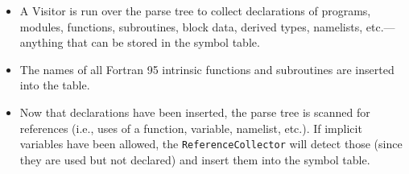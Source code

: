 \begin{itemize}

\item A Visitor is run over the parse tree to collect declarations of
programs, modules, functions, subroutines, block data, derived types,
namelists, etc.---anything that can be stored in the symbol table.

\item The names of all Fortran 95 intrinsic functions and subroutines
are inserted into the table.

\item Now that declarations have been inserted, the parse tree is scanned
for references (i.e., uses of a function, variable, namelist, etc.).
If implicit variables have been allowed, the \texttt{ReferenceCollector} will
detect those (since they are used but not declared) and insert them into the
symbol table.

\end{itemize}

